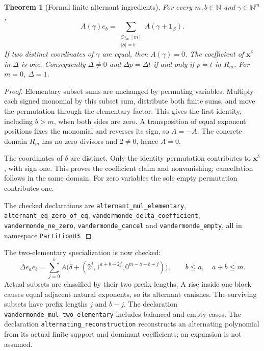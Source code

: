 \documentclass[11pt,a4paper]{article}
\newtheorem{theorem}{Theorem}[section]
\theoremstyle{definition}
\newcommand{\N}{\mathbb N}
\begin{document}
\begin{theorem}[Formal finite alternant ingredients]\label{thm:formalalternant}
For every $m,b\in\N$ and $\gamma\in\N^m$,
\[
 A(\gamma)e_b=\sum_{\substack{S\subseteq[m]\\|S|=b}}
                       A(\gamma+\mathbf1_S).
\]
If two distinct coordinates of $\gamma$ are equal, then $A(\gamma)=0$.
The coefficient of $\mathbf x^\delta$ in $\Delta$ is one. Consequently
$\Delta\ne0$ and $\Delta p=\Delta t$ if and only if $p=t$ in $R_m$.
For $m=0$, $\Delta=1$.
\end{theorem}
\begin{proof}
Elementary subset sums are unchanged by permuting variables. Multiply each
signed monomial by this subset sum, distribute both finite sums, and move
the permutation through the elementary factor. This gives the first identity,
including $b>m$, when both sides are zero. A transposition of equal exponent
positions fixes the monomial and reverses its sign, so $A=-A$. The concrete
domain $R_m$ has no zero divisors and $2\ne0$, hence $A=0$.

The coordinates of $\delta$ are distinct. Only the identity permutation
contributes to $\mathbf x^\delta$, with sign one. This proves the coefficient
claim and nonvanishing; cancellation follows in the same domain. For zero
variables the sole empty permutation contributes one.
\par\begingroup\raggedright
The checked declarations are \texttt{alternant\_mul\_elementary},
\texttt{alternant\_eq\_zero\_of\_eq},
\texttt{vandermonde\_delta\_coefficient},
\texttt{vandermonde\_\allowbreak ne\_\allowbreak zero},
\texttt{vandermonde\_\allowbreak cancel} and
\texttt{vandermonde\_\allowbreak empty}, all in namespace \texttt{PartitionH3}.
\par\endgroup
\end{proof}

The two-elementary specialization is now checked:
\[
 \Delta e_a e_b=\sum_{j=0}^b
 A\bigl(\delta+(2^j,1^{a+b-2j},0^{m-a-b+j})\bigr),
 \qquad b\le a,\quad a+b\le m.
\]
Actual subsets are classified by their two prefix lengths. A rise inside
one block causes equal adjacent natural exponents, so its alternant vanishes.
The surviving subsets have prefix lengths $j$ and $b-j$.
The declaration \texttt{vandermonde\_mul\_two\_elementary} includes balanced
and empty cases. The declaration \texttt{alternating\_reconstruction}
reconstructs an alternating polynomial from its actual finite support and
dominant coefficients; an expansion is not assumed.
\end{document}
